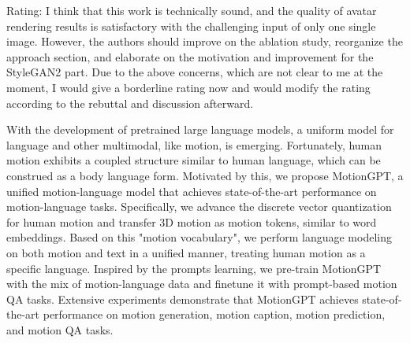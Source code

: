 Rating:
I think that this work is technically sound, and the quality of avatar rendering results is satisfactory with the challenging input of only one single image. However, the authors should improve on the ablation study, reorganize the approach section, and elaborate on the motivation and improvement for the StyleGAN2 part. Due to the above concerns, which are not clear to me at the moment, I would give a borderline rating now and would modify the rating according to the rebuttal and discussion afterward.





 
  With the development of pretrained large language models, a uniform model for language and other multimodal, like motion, is emerging.
  Fortunately, human motion exhibits a coupled structure similar to human language, which can be construed as a body language form. 
  Motivated by this, we propose MotionGPT, a unified motion-language model that achieves state-of-the-art performance on motion-language tasks.
  Specifically, we advance the discrete vector quantization for human motion and transfer 3D motion as motion tokens, similar to word embeddings. 
  Based on this "motion vocabulary", we perform language modeling on both motion and text in a unified manner, treating human motion as a specific language.
  Inspired by the prompts learning, we pre-train MotionGPT with the mix of motion-language data and finetune it with prompt-based motion QA tasks.
  Extensive experiments demonstrate that MotionGPT achieves state-of-the-art performance on motion generation, motion caption, motion prediction, and motion QA tasks.


